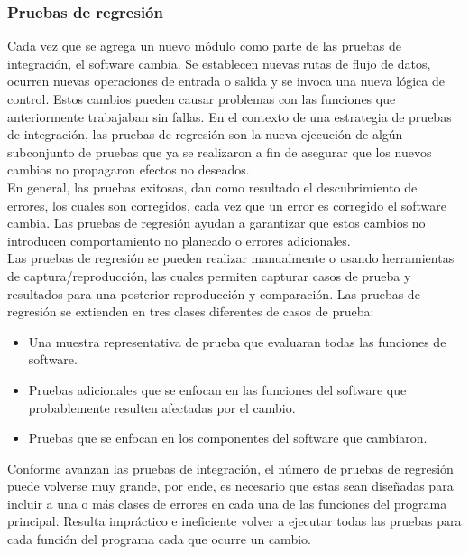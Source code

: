 \subsubsection{Pruebas de regresión}
Cada vez que se agrega un nuevo módulo como parte de las pruebas de integración, el software cambia. Se establecen nuevas rutas de flujo de datos, ocurren nuevas operaciones de entrada o salida y se invoca una nueva lógica de control. Estos cambios pueden causar problemas con las funciones que anteriormente trabajaban sin fallas. En el contexto de una estrategia de pruebas de integración, las pruebas de regresión son la nueva ejecución de algún subconjunto de pruebas que ya se realizaron a fin de asegurar que los nuevos cambios no propagaron efectos no deseados.\\ En general, las pruebas exitosas, dan como resultado el descubrimiento de errores, los cuales son corregidos, cada vez que un error es corregido el software cambia. Las pruebas de regresión ayudan a garantizar que estos cambios no introducen comportamiento no planeado o errores adicionales.\\ Las pruebas de regresión se pueden realizar manualmente o usando herramientas de captura/reproducción, las cuales permiten capturar casos de prueba y resultados para una posterior reproducción y comparación. Las pruebas de regresión se extienden en tres clases diferentes de casos de prueba:
\begin{itemize}
	\item Una muestra representativa de prueba que evaluaran todas las funciones de software.
	\item Pruebas adicionales que se enfocan en las funciones del software que probablemente resulten afectadas por el cambio.
	\item Pruebas que se enfocan en los componentes del software que cambiaron.
\end{itemize}
Conforme avanzan las pruebas de integración, el número de pruebas de regresión puede volverse muy grande, por ende, es necesario que estas sean diseñadas para incluir a una o más clases de errores en cada una de las funciones del programa principal. Resulta impráctico e ineficiente volver a ejecutar todas las pruebas para cada función del programa cada que ocurre un cambio.
